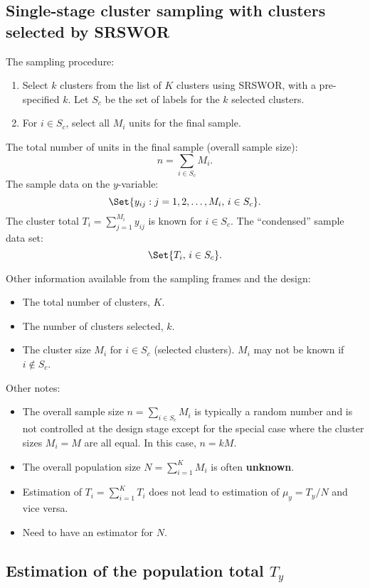 \subsection{Single-stage cluster sampling with clusters selected by SRSWOR}
The sampling procedure:
\begin{enumerate}
      \item Select $ k $ clusters from the list of $ K $ clusters using SRSWOR, with a pre-specified
            $ k $. Let $ S_c $ be the set of labels for the $ k $ selected clusters.
      \item For $ i\in S_c $, select all $ M_i $ units for the final sample.
\end{enumerate}
The total number of units in the final sample (overall sample size):
\[ n=\sum_{i\in S_c}M_i. \]
The sample data on the $ y $-variable:
\[ \Set{y_{ij}\given j=1,2,\ldots,M_i,\, i\in S_c}. \]
The cluster total $ T_i=\sum_{j=1}^{M_i}y_{ij} $ is known for $ i\in S_c $. The
``condensed'' sample data set:
\[ \Set{T_i,\, i\in S_c}. \]

Other information available from the sampling frames and the design:
\begin{itemize}
      \item The total number of clusters, $ K $.
      \item The number of clusters selected, $ k $.
      \item The cluster size $ M_i $ for $ i\in S_c $ (selected clusters). $ M_i $
            may not be known if $ i\notin S_c $.
\end{itemize}
Other notes:
\begin{itemize}
      \item The overall sample size $ n=\sum_{i\in S_c} M_i $ is typically a random number and is not controlled
            at the design stage except for the special case where the cluster sizes $ M_i=M $ are all equal. In this case,
            $ n=kM $.
      \item The overall population size $ N=\sum_{i=1}^{K}M_i $ is often \textbf{unknown}.
      \item Estimation of $ T_i=\sum_{i=1}^{K}T_i $ does not lead to estimation of $ \mu_y=T_y/N $ and vice versa.
      \item Need to have an estimator for $ N $.
\end{itemize}

\subsection{Estimation of the population total \texorpdfstring{$ T_y $}{Ty}}

